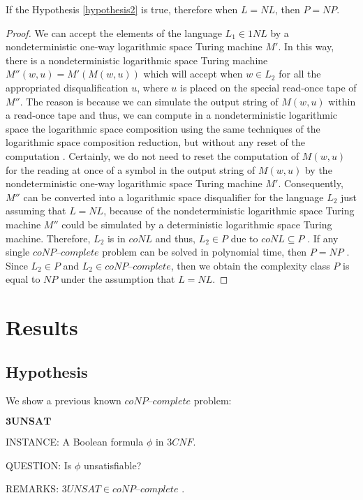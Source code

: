 \documentclass[a4paper,UKenglish,cleveref, autoref]{lipics-v2019}
\begin{document}
\begin{theorem}
\label{pos-implication}
If the Hypothesis \ref{hypothesis2} is true, therefore when $L = NL$, then $P = NP$.
\end{theorem}

\begin{proof}
We can accept the elements of the language $L_{1} \in 1NL$ by a nondeterministic one-way logarithmic space Turing machine $M'$. In this way, there is a nondeterministic logarithmic space Turing machine $M''(w, u) = M'(M(w, u))$ which will accept when $w \in L_{2}$ for all the appropriated disqualification $u$, where $u$ is placed on the special read-once tape of $M''$. The reason is because we can simulate the output string of $M(w, u)$ within a read-once tape and thus, we can compute in a nondeterministic logarithmic space the logarithmic space composition using the same techniques of the logarithmic space composition reduction, but without any reset of the computation \cite{Pap03}. Certainly, we do not need to reset the computation of $M(w, u)$ for the reading at once of a symbol in the output string of $M(w, u)$ by the nondeterministic one-way logarithmic space Turing machine $M'$. Consequently, $M''$ can be converted into a logarithmic space disqualifier for the language $L_{2}$ just assuming that $L = NL$, because of the nondeterministic logarithmic space Turing machine $M''$ could be simulated by a deterministic logarithmic space Turing machine. Therefore, $L_{2}$ is in $coNL$ and thus, $L_{2} \in P$ due to $coNL \subseteq P$ \cite{Pap03}. If any single $\textit{coNP--complete}$ problem can be solved in polynomial time, then $P = NP$ \cite{Pap03}. Since $L_{2} \in P$ and $L_{2} \in \textit{coNP--complete}$, then we obtain the complexity class $P$ is equal to $NP$ under the assumption that $L = NL$.
\end{proof}

\section{Results}

\subsection{Hypothesis}

We show a previous known $\textit{coNP--complete}$ problem:

\begin{definition}
$\textbf{3UNSAT}$

INSTANCE: A Boolean formula $\phi$ in $3CNF$.

QUESTION: Is $\phi$ unsatisfiable?

REMARKS: $3UNSAT \in \textit{coNP--complete}$ \cite{GJ79}.
\end{definition}
\end{document}
